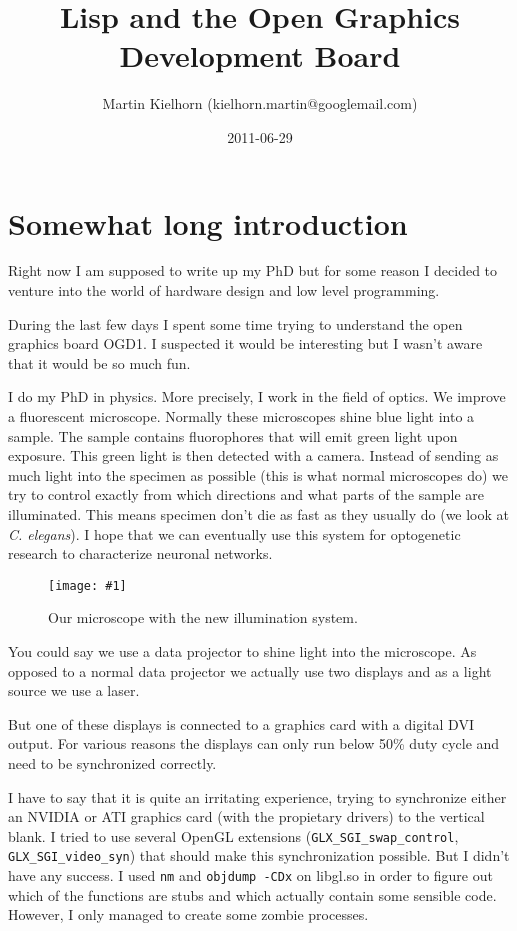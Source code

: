 \documentclass[%
  DIV19]{scrartcl}
\title{Lisp and the Open Graphics Development Board}
\author{Martin Kielhorn (kielhorn.martin@googlemail.com)}
\date{2011-06-29}
\newcommand{\bild}[1]{\texttt{[image: \#1]}}
\begin{document}
\maketitle 

\section{Somewhat long introduction}
Right now I am supposed to write up my PhD but for some reason I
decided to venture into the world of hardware design and low level
programming.

During the last few days I spent some time trying to understand the
open graphics board OGD1. I suspected it would be interesting but I
wasn't aware that it would be so much fun.

I do my PhD in physics. More precisely, I work in the field of
optics. We improve a fluorescent microscope. Normally these
microscopes shine blue light into a sample. The sample contains
fluorophores that will emit green light upon exposure. This green
light is then detected with a camera. Instead of sending as much light
into the specimen as possible (this is what normal microscopes do) we
try to control exactly from which directions and what parts of the
sample are illuminated. This means specimen don't die as fast as they
usually do (we look at \emph{C. elegans}). I hope that we can
eventually use this system for optogenetic research to characterize
neuronal networks.

\begin{figure}
  \centering
  \bild{system.jpg}
  \caption{Our microscope with the new illumination system.}
\end{figure}

You could say we use a data projector to shine light into the
microscope. As opposed to a normal data projector we actually use two
displays and as a light source we use a laser.

But one of these displays is connected to a graphics card with a
digital DVI output. For various reasons the displays can only run
below 50\% duty cycle and need to be synchronized correctly.

I have to say that it is quite an irritating experience, trying to
synchronize either an NVIDIA or ATI graphics card (with the propietary
drivers) to the vertical blank. I tried to use several OpenGL
extensions (\verb!GLX_SGI_swap_control!, \verb!GLX_SGI_video_syn!)
that should make this synchronization possible. But I didn't have any
success. I used \verb!nm! and \verb!objdump -CDx! on libgl.so in order
to figure out which of the functions are stubs and which actually
contain some sensible code. However, I only managed to create some
zombie processes.
\end{document}
